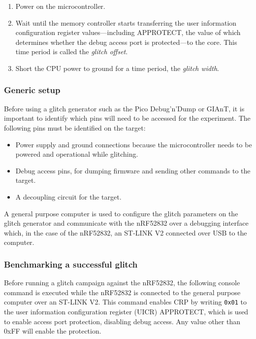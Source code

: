 \begin{enumerate}
\def\labelenumi{\arabic{enumi}.}
\tightlist
\item
  Power on the microcontroller.
\item
  Wait until the memory controller starts transferring the user
  information configuration register values---including APPROTECT, the
  value of which determines whether the debug access port is
  protected---to the core. This time period is called the \emph{glitch
  offset}.
\item
  Short the CPU power to ground for a time period, the \emph{glitch
  width}.
\end{enumerate}

\hypertarget{generic-setup}{%
\subsubsection{Generic setup}\label{generic-setup}}

Before using a glitch generator such as the Pico Debug'n'Dump or GIAnT,
it is important to identify which pins will need to be accessed for the
experiment. The following pins must be identified on the target:

\begin{itemize}
\tightlist
\item
  Power supply and ground connections because the microcontroller needs
  to be powered and operational while glitching.
\item
  Debug access pins, for dumping firmware and sending other commands to
  the target.
\item
  A decoupling circuit for the target.
\end{itemize}

A general purpose computer is used to configure the glitch parameters on
the glitch generator and communicate with the nRF52832 over a debugging
interface which, in the case of the nRF52832, an ST-LINK V2 connected
over USB to the computer.

\hypertarget{benchmarking-a-successful-glitch}{%
\subsubsection{Benchmarking a successful
glitch}\label{benchmarking-a-successful-glitch}}

Before running a glitch campaign against the nRF52832, the following
console command is executed while the nRF52832 is connected to the
general purpose computer over an ST-LINK V2. This command enables CRP by
writing \texttt{0x01} to the user information configuration register
(UICR) APPROTECT, which is used to enable access port protection,
disabling debug access. Any value other than 0xFF will enable the
protection.

